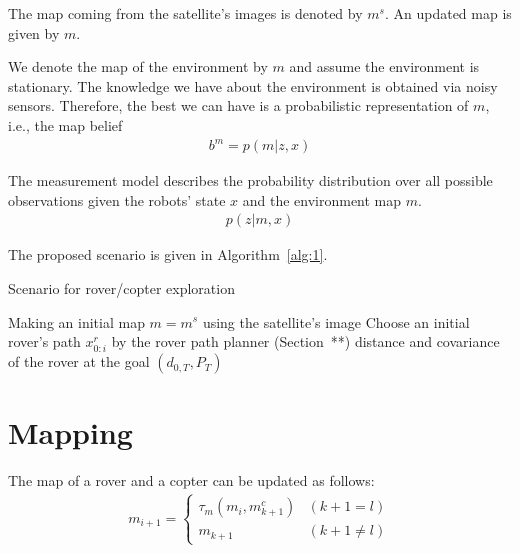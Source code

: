\documentclass[conference]{IEEEtran}
\begin{document}
The map coming from the satellite's images is denoted by $m^s$. An updated map is given by $m$. 

We denote the map of the environment by $m$ and assume the environment is stationary. The knowledge we have about the environment is obtained via noisy sensors. Therefore, the best we can have is a probabilistic representation of $m$, i.e., the map belief
\begin{align}
    b^m=p(m|z, x)
\end{align}

The measurement model describes the probability distribution over all possible observations given the robots' state $x$ and the environment map $m$.
\begin{align}
    p(z|m, x)
\end{align}

The proposed scenario is given in Algorithm~\ref{alg:1}.

\begin{algorithm}[!ht]
\caption{Scenario for rover/copter exploration}
\label{alg:1}
\DontPrintSemicolon
Making an initial map $m=m^s$ using the satellite's image\;
Choose an initial rover's path $x^r_{0:i}$ by the rover path planner (Section~**)\;
\Return distance and covariance of the rover at the goal $(d_{0,T}, P_T)$
\end{algorithm}


\section{Mapping}


The map of a rover and a copter can be updated as follows:
\begin{eqnarray}
m_{i+1} =
  \begin{cases}
    \tau_m (m_{i}, m^c_{k+1}) & (k+1 = l)\\
    m_{k+1} & (k+1 \neq l)
  \end{cases}
\end{eqnarray}
\end{document}
